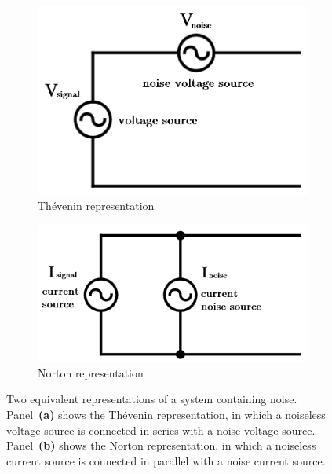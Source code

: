 \begin{figure}[h]
    \centering
    \begin{subfigure}[b]{.43\textwidth}
        \includegraphics[width=\textwidth]{Figures/Noise/thevenin.png}%
        \caption{Th\'evenin representation}
        \label{fig:thevenin}
    \end{subfigure}
    \begin{subfigure}[b]{.49\textwidth}
        \includegraphics[width=\textwidth]{Figures/Noise/norton.png}%
        \caption{Norton representation}
        \label{fig:norton}
    \end{subfigure}
    \caption{Two equivalent representations of a system containing noise. Panel~\textbf{(a)} shows the Th\'evenin representation, in which a noiseless voltage source is connected in series with a noise voltage source. Panel~\textbf{(b)} shows the Norton representation, in which a noiseless current source is connected in parallel with a noise current source.}
\end{figure}

